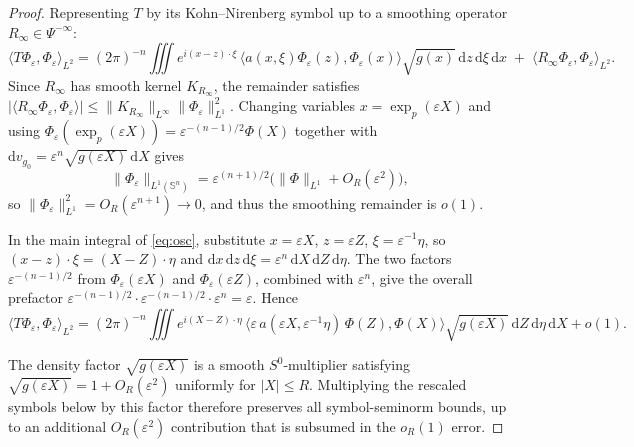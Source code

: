 \documentclass[10pt,a4paper]{amsart}
\begin{document}
\begin{proof}
	Representing $T$ by its Kohn--Nirenberg symbol up to a smoothing operator
	$R_\infty \in \Psi^{-\infty}$:
	\begin{equation}\label{eq:osc}
		\langle T\Phi_\varepsilon,\Phi_\varepsilon\rangle_{L^2}
		= (2\pi)^{-n}
		\iiint
		e^{i(x-z)\cdot\xi}\,
		\bigl\langle a(x,\xi)\Phi_\varepsilon(z),\Phi_\varepsilon(x)\bigr\rangle
		\sqrt{g(x)}\,\mathrm{d}z\,\mathrm{d}\xi\,\mathrm{d}x
		\;+\; \langle R_\infty\Phi_\varepsilon,\Phi_\varepsilon\rangle_{L^2}.
	\end{equation}
	Since $R_\infty$ has smooth kernel $K_{R_\infty}$, the remainder satisfies
	$|\langle R_\infty\Phi_\varepsilon,\Phi_\varepsilon\rangle|
	\le \|K_{R_\infty}\|_{L^\infty}\|\Phi_\varepsilon\|_{L^1}^2$.
	Changing variables $x = \exp_p(\varepsilon X)$ and using
	$\Phi_\varepsilon(\exp_p(\varepsilon X)) = \varepsilon^{-(n-1)/2}\Phi(X)$
	together with $\mathrm{d}v_{g_0} = \varepsilon^n\sqrt{g(\varepsilon X)}\,\mathrm{d}X$
	gives
	\[
	\|\Phi_\varepsilon\|_{L^1(\mathbb{S}^n)}
	= \varepsilon^{(n+1)/2}\bigl(\|\Phi\|_{L^1} + O_R(\varepsilon^2)\bigr),
	\]
	so $\|\Phi_\varepsilon\|_{L^1}^2 = O_R(\varepsilon^{n+1}) \to 0$, and thus
	the smoothing remainder is $o(1)$.
	
	In the main integral of \eqref{eq:osc}, substitute $x = \varepsilon X$,
	$z = \varepsilon Z$, $\xi = \varepsilon^{-1}\eta$, so
	$(x-z)\cdot\xi = (X-Z)\cdot\eta$ and
	$\mathrm{d}x\,\mathrm{d}z\,\mathrm{d}\xi = \varepsilon^n\,\mathrm{d}X\,\mathrm{d}Z\,\mathrm{d}\eta$.
	The two factors $\varepsilon^{-(n-1)/2}$ from $\Phi_\varepsilon(\varepsilon X)$
	and $\Phi_\varepsilon(\varepsilon Z)$, combined with $\varepsilon^n$, give the
	overall prefactor $\varepsilon^{-(n-1)/2}\cdot\varepsilon^{-(n-1)/2}\cdot
	\varepsilon^n = \varepsilon$. Hence
	\begin{equation}\label{eq:rescaled}
		\langle T\Phi_\varepsilon,\Phi_\varepsilon\rangle_{L^2}
		= (2\pi)^{-n}
		\iiint
		e^{i(X-Z)\cdot\eta}\,
		\bigl\langle
		\varepsilon\,a(\varepsilon X,\varepsilon^{-1}\eta)\,\Phi(Z),
		\Phi(X)
		\bigr\rangle
		\sqrt{g(\varepsilon X)}\,\mathrm{d}Z\,\mathrm{d}\eta\,\mathrm{d}X
		+ o(1).
	\end{equation}
	
	The density factor $\sqrt{g(\varepsilon X)}$ is a smooth $S^0$-multiplier
	satisfying $\sqrt{g(\varepsilon X)} = 1 + O_R(\varepsilon^2)$ uniformly for
	$|X| \le R$. Multiplying the rescaled symbols below by this factor therefore
	preserves all symbol-seminorm bounds, up to an additional $O_R(\varepsilon^2)$
	contribution that is subsumed in the $o_R(1)$ error.
	

\end{proof}
\end{document}
